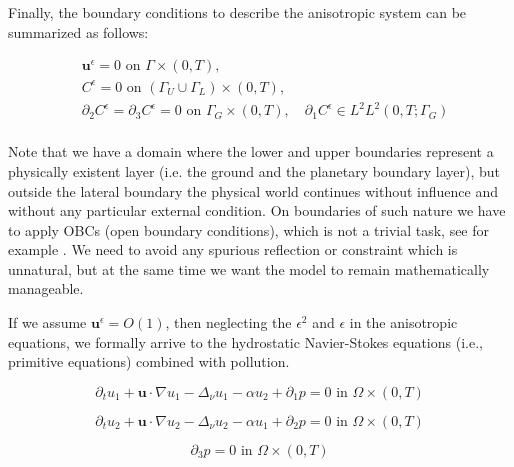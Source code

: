 \documentclass[11pt]{article}
\begin{document}
  Finally, the boundary conditions to describe the anisotropic system can be summarized as follows:
  
    \begin{equation} \label{ANSC8}
      \begin{split}
        & \mathbf{u}^\epsilon = 0 \text{ on } \Gamma \times (0,T), \\
        &C^\epsilon = 0 \text{ on } ( \Gamma_U \cup \Gamma_L) \times (0,T), \\
        & \partial_2 C^\epsilon = \partial_3 C^\epsilon = 0 \text{ on } \Gamma_G \times (0,T), \quad \partial_1 C^\epsilon \in L^2 L^2 (0,T; \Gamma_G) \\
      \end{split}
    \end{equation}

Note that we have a domain where the lower and upper boundaries represent a physically existent layer (i.e. the ground and the planetary boundary layer), but outside the lateral boundary the physical world continues without influence and without any particular external condition. On boundaries of such nature we have to apply OBCs (open boundary conditions), which is not a trivial task, see for example \cite{wang2014ocean}. We need to avoid any spurious reflection or constraint which is unnatural, but at the same time we want the model to remain mathematically manageable.

If we assume $\mathbf{u}^\epsilon = O(1)$, then neglecting the $\epsilon^2$ and $\epsilon$ in the anisotropic equations, we formally arrive to the hydrostatic Navier-Stokes equations (i.e., primitive equations) combined with pollution.

    \begin{equation} \label{HNSC1}    
    \partial_t u_1 + \mathbf{u} \cdot \nabla u_1 - \Delta_\nu u_1 -\alpha u_2 + \partial_1 p = 0 \text{ in } \Omega \times (0,T)
    \end{equation}
    
    \begin{equation} \label{HNSC2}   
    \partial_t u_2 + \mathbf{u} \cdot \nabla u_2 - \Delta_\nu u_2 -\alpha u_1 + \partial_2 p = 0 \text{ in } \Omega \times (0,T)
    \end{equation}
    
    \begin{equation} \label{HNSC3}   
    \partial_3 p = 0 \text{ in } \Omega \times (0,T)
    \end{equation}
    
\end{document}
